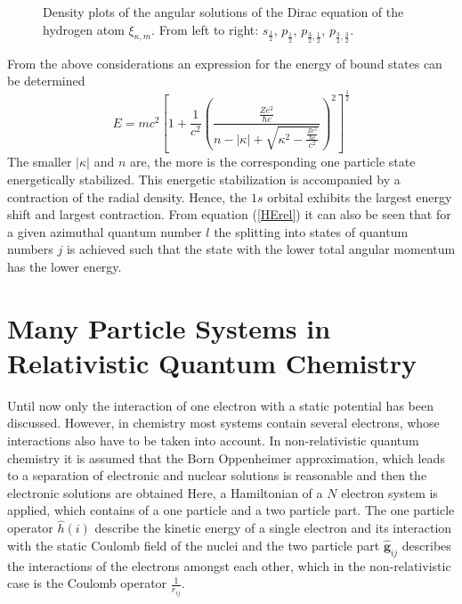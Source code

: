 \begin{figure}
\centering
     \hfill
     \hfill
   \hfill
  \raisebox{1cm}{}
\caption{Density plots of the angular solutions of the Dirac equation
         of the hydrogen atom $\xi_{\kappa,m}$. From left to right:
         $s_{\frac12}$, $p_{\frac12}$, $p_{\frac32,\frac12}$,
         $p_{\frac32,\frac32}$.}
\label{figure:ang_orb}
\end{figure}


From the above considerations an expression for the energy of bound states can be
determined
\begin{equation}\label{HErel}
E = mc^2 \left[1+ \frac1{c^2}
    \left(\frac{\frac{Ze^2}{\hbar c}}{n-|\kappa|+
         \sqrt{\kappa^2-\frac{\frac{Ze^2}{\hbar c}}{c^2}}}\right)^2
    \right]^{\frac12}
\end{equation}
The smaller $|\kappa|$ and $n$ are, the more is the corresponding one particle
state energetically stabilized. This energetic stabilization is accompanied
by a contraction of the radial density. Hence, the $1s$ orbital exhibits the
largest energy shift and largest contraction. From equation
(\ref{HErel}) it can also be seen
that for a given azimuthal quantum number $l$ the splitting into states of quantum
numbers $j$ is achieved such that the state with the lower total angular momentum
has the lower energy.


\section{Many Particle Systems in Relativistic Quantum Chemistry}
Until now only the interaction of one electron with a static potential has been
discussed. However, in chemistry most systems contain several electrons, whose
interactions also have to be taken into account.
In non-relativistic quantum chemistry it is assumed that the Born Oppenheimer
approximation, which leads to a separation of electronic and nuclear solutions
is reasonable and then the electronic solutions are obtained
Here, a Hamiltonian of a $N$ electron system is applied, which contains
of a one particle and a two particle part. The one particle operator $\hat{h}(i)$
describe the kinetic energy of a single electron and its interaction with the
static Coulomb field of the nuclei and the two particle part $\mathbf{\hat{g}}_{ij}$
describes the interactions of the electrons amongst each other, which in the
non-relativistic case is the Coulomb operator $\frac1{r_{ij}}$.

